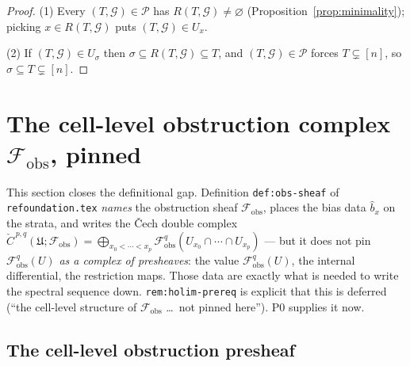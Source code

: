 \documentclass[11pt,oneside]{amsart}
\theoremstyle{plain}
\theoremstyle{definition}
\theoremstyle{remark}
\theoremstyle{honeststyle}
\newcommand{\G}{\mathcal{G}}
\newcommand{\fobs}{\mathcal{F}_{\mathrm{obs}}}
\newcommand{\Pp}{\mathcal{P}}
\newcommand{\Uf}{\mathfrak{U}}
\newcommand{\rare}{R}
\newcommand{\Ccheck}{\check{C}}
\begin{document}
\begin{proof}
(1) Every $(T,\G)\in\Pp$ has $\rare(T,\G)\neq\varnothing$
(Proposition~\ref{prop:minimality}); picking $x\in\rare(T,\G)$ puts
$(T,\G)\in U_{x}$.

(2) If $(T,\G)\in U_{\sigma}$ then $\sigma\subseteq\rare(T,\G)\subseteq
T$, and $(T,\G)\in\Pp$ forces $T\subsetneq[n]$, so $\sigma\subseteq
T\subsetneq[n]$.
\end{proof}

\section{The cell-level obstruction complex $\fobs$, pinned}
\label{sec:fobs}

This section closes the definitional gap. Definition
\texttt{def:obs-sheaf} of \texttt{refoundation.tex} \emph{names} the
obstruction sheaf $\fobs$, places the bias data $\widehat b_{x}$ on
the strata, and writes the \v{C}ech double complex
$\Ccheck^{\,p,q}(\Uf;\fobs)=\bigoplus_{x_{0}<\cdots<x_{p}}
\fobs^{q}(U_{x_{0}}\cap\cdots\cap U_{x_{p}})$ --- but it does not pin
$\fobs^{q}(U)$ \emph{as a complex of presheaves}: the value
$\fobs^{q}(U)$, the internal differential, the restriction maps. Those
data are exactly what is needed to write the spectral sequence down.
\texttt{rem:holim-prereq} is explicit that this is deferred (``the
cell-level structure of $\fobs$ \dots\ not pinned here''). P0 supplies
it now.

\subsection{The cell-level obstruction presheaf}
\label{ssec:fobsdef}
\end{document}
